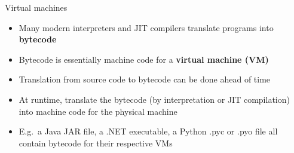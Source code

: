 \begin{frame}{Virtual machines}
	\begin{itemize}
		\pause\item Many modern interpreters and JIT compilers translate programs into \textbf{bytecode}
		\pause\item Bytecode is essentially machine code for a \textbf{virtual machine (VM)}
		\pause\item Translation from source code to bytecode can be done ahead of time
		\pause\item At runtime, translate the bytecode (by interpretation or JIT compilation) into machine code for the physical machine
		\pause\item E.g.\ a Java JAR file, a .NET executable, a Python .pyc or .pyo file
			all contain bytecode for their respective VMs
	\end{itemize}
\end{frame}

